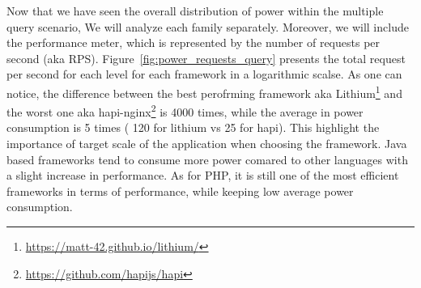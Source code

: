 \begin{table}[bth]
    \raggedright
    \caption{Average power consumption of frameworks based on the database type}
    \label{table:query_db_row}
\end{table}

Now that we have seen the overall distribution of power within the multiple query scenario, We will analyze each family separately. Moreover, we will include the performance meter, which is represented by the number of requests per second (aka RPS). Figure~\ref{fig:power_requests_query} presents the total request per second for each level for each framework in a logarithmic scalse. As one can notice, the difference between the best perofrming framework aka Lithium\footnote{\url{https://matt-42.github.io/lithium/}} and the worst one aka hapi-nginx\footnote{\url{https://github.com/hapijs/hapi}} is 4000 times, while the average in power consumption is 5 times ( 120 for lithium vs 25 for hapi). This highlight the importance of target scale of the application when choosing the framework.
Java based frameworks tend to consume more power comared to other languages with a slight increase in performance.
As for PHP, it is still one of the most efficient frameworks in terms of performance, while keeping low average power consumption.

